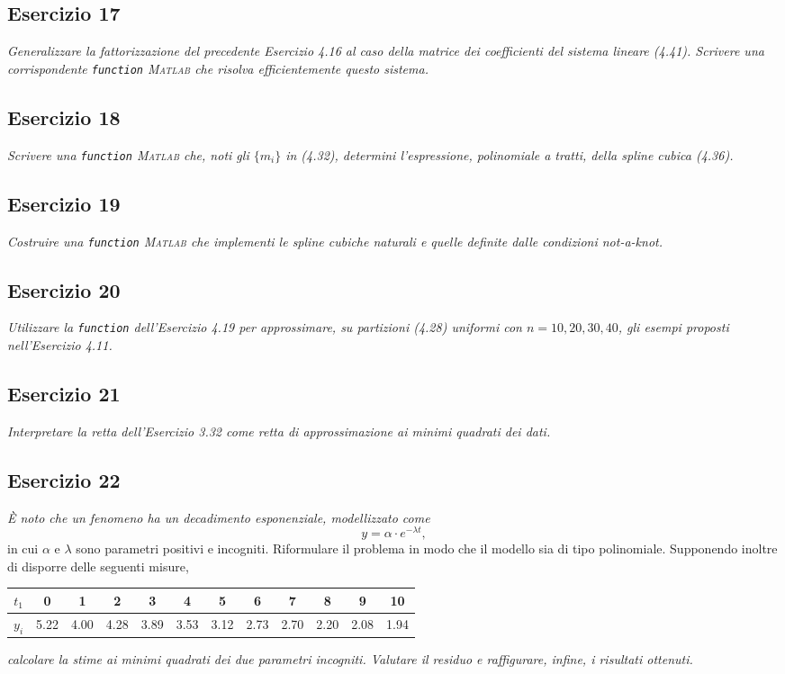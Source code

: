 \subsection{Esercizio 17}
\label{sub:Esercizio 17}
\emph{Generalizzare la fattorizzazione del precedente Esercizio 4.16 al caso della matrice dei coefficienti del sistema lineare
(4.41). Scrivere una corrispondente \lstinline{function} \textsc{Matlab} che risolva efficientemente questo sistema.
}
\subsection{Esercizio 18}
\label{sub:Esercizio 18}
\emph{Scrivere una \lstinline{function} \textsc{Matlab} che, noti gli $\{m_i\}$ in (4.32), determini l'espressione,
polinomiale a tratti, della spline cubica (4.36).}

\subsection{Esercizio 19}
\label{sub:Esercizio 19}
\emph{Costruire una \lstinline{function} \textsc{Matlab} che implementi le spline cubiche naturali e quelle definite dalle condizioni not-a-knot.
}
\subsection{Esercizio 20}
\label{sub:Esercizio 20}
\emph{Utilizzare la \lstinline{function} dell'Esercizio 4.19 per approssimare,
su partizioni (4.28) uniformi con $n=10,20,30,40$, gli esempi proposti nell'Esercizio 4.11.}

\subsection{Esercizio 21}
\label{sub:Esercizio 21}
\emph{Interpretare la retta dell'Esercizio 3.32 come retta di approssimazione ai minimi quadrati dei dati.}

\subsection{Esercizio 22}
\label{sub:Esercizio 22}
\emph{È noto che un fenomeno ha un decadimento esponenziale, modellizzato come}
			$$y=\alpha\cdot e^{-\lambda t},$$
			in cui $\alpha$ e $\lambda$ sono parametri positivi e incogniti. Riformulare il problema in modo che il modello sia di tipo polinomiale. Supponendo inoltre di disporre delle seguenti misure,
			\begin{center}
				\setlength{\tabcolsep}{4pt}
				\begin{tabular}{|c|c c c c c c c c c c c|}
					\hline
					$t_1$ & 0 & 1 & 2 & 3 & 4 & 5 & 6 & 7 & 8 & 9 & 10\\
					\hline
					$y_i$ & 5.22 & 4.00 & 4.28 & 3.89 & 3.53 & 3.12 & 2.73 & 2.70 & 2.20 & 2.08 & 1.94\\
					\hline
				\end{tabular}
			\end{center}
\emph{calcolare la stime ai minimi quadrati dei due parametri incogniti. Valutare il residuo e raffigurare, infine, i risultati ottenuti.}
